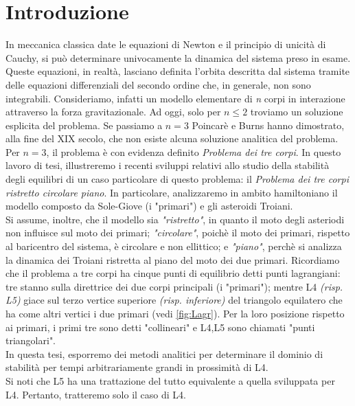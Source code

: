 \documentclass[a4paper,11pt,titlepage]{report}
\theoremstyle{definition}
\theoremstyle{plain}
\begin{document}
\restoregeometry

\newpage
\thispagestyle{empty}
\mbox{}


\newpage
\thispagestyle{empty}

\tableofcontents
\chapter*{Introduzione}

In meccanica classica date le equazioni di Newton e il principio di unicità di Cauchy, si può determinare univocamente la dinamica del sistema preso in esame.
Queste equazioni, in realtà, lasciano definita l'orbita descritta dal sistema tramite delle equazioni differenziali del secondo ordine che, in generale, non sono integrabili.
Consideriamo, infatti un modello elementare di \textit{n} corpi in interazione attraverso la forza gravitazionale. Ad oggi, solo per $\textit{n} \leq 2$ troviamo un soluzione esplicita del problema. Se passiamo a $\textit{n}=3$ Poincarè e Burns hanno dimostrato, alla fine del XIX secolo, che non esiste alcuna soluzione analitica del problema.
Per $n=3$, il problema è con evidenza definito \textit{Problema dei tre corpi}.
In questo lavoro di tesi, illustreremo i recenti sviluppi relativi allo studio della stabilità degli equilibri di un caso particolare di questo problema: il \textit{Problema dei tre corpi ristretto circolare piano}.
In particolare, analizzaremo in ambito hamiltoniano il modello composto da Sole-Giove (i "primari") e gli asteroidi Troiani.
\\Si assume, inoltre, che il modello sia \textit{"ristretto"}, in quanto il moto degli asteriodi non influisce sul moto dei primari; \textit{"circolare"}, poichè il moto dei primari, rispetto al baricentro del sistema, è circolare e non ellittico; e \textit{"piano"}, perchè si analizza la dinamica dei Troiani ristretta al piano del moto dei due primari.
Ricordiamo che il problema a tre corpi ha cinque punti di equilibrio detti punti lagrangiani: tre stanno sulla direttrice dei due corpi principali (i "primari"); mentre L4 \textit{(risp. L5)} giace sul terzo vertice superiore \textit{(risp. inferiore)} del triangolo equilatero che ha come altri vertici i due primari (vedi \ref{fig:Lagr}). Per la loro posizione rispetto ai primari, i primi tre sono detti "collineari" e L4,L5 sono chiamati "punti triangolari".\\
In questa tesi, esporremo dei metodi analitici per determinare il dominio di stabilità per tempi arbitrariamente grandi in prossimità di L4. \\Si noti che L5 ha una trattazione del tutto equivalente a quella sviluppata per L4. Pertanto, tratteremo solo il caso di L4.\\\\
\end{document}
